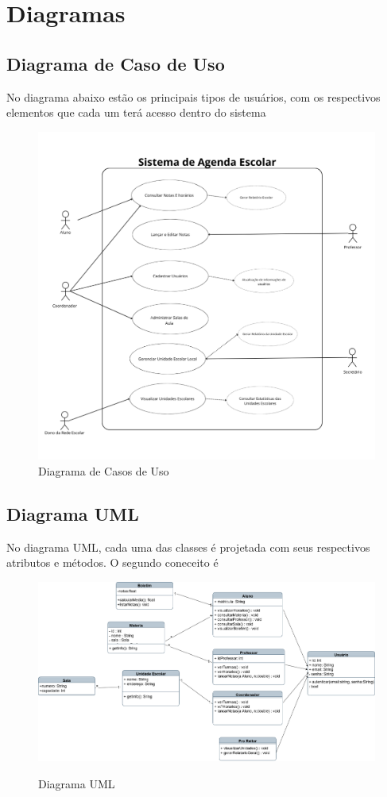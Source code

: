 \documentclass[12pt,a4paper]{report}
\begin{document}

\chapter{Diagramas}
\section{Diagrama de Caso de Uso}
\label{sec:DCU}
No diagrama abaixo estão os principais tipos de usuários, com os respectivos elementos que cada um terá acesso dentro do sistema
\begin{figure}[!h]
	\centering
	\includegraphics[scale=.51]{imagens/aluno.png}
	\caption{Diagrama de Casos de Uso}
	\label{Diagrama de Casos de Uso}
\end{figure}

\section{Diagrama UML}
No diagrama UML, cada uma das classes é projetada com seus respectivos atributos e métodos.
O segundo coneceito é 
\begin{figure}[!h]
	\centering
	\includegraphics[width = \linewidth]{imagens/uml.png}
	\label{Diagrama UML}
	\caption{Diagrama UML}
\end{figure}
\end{document}
